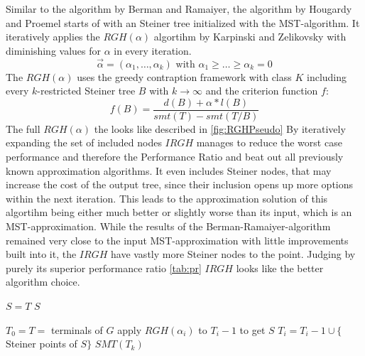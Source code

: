 Similar to the algorithm by Berman and Ramaiyer, the algorithm by Hougardy and Proemel \cite{HoPr99} starts of with an Steiner tree initialized with the MST-algorithm. It iteratively applies the $RGH(\alpha)$ algortihm by Karpinski and Zelikovsky \cite{karpinski1997new} with diminishing values for $\alpha$ in every iteration.$$\vec{\alpha}=(\alpha_1,\dots,\alpha_k) \text{ with } \alpha_1 \geq \dots \geq \alpha_k=0$$ 
The $RGH(\alpha)$ uses the greedy contraption framework \cite{karpinski1997new} with class $K$ including every $k$-restricted Steiner tree $B$ with $k\to\infty$ and the criterion function $f$: $$ f(B) = \frac{d(B) + \alpha * l(B)}{smt(T)-smt(T/B)} $$
The full $RGH(\alpha)$ the looks like described in \ref{fig:RGHPseudo}
By iteratively expanding the set of included nodes $IRGH$ manages to reduce the worst case performance and therefore the Performance Ratio and beat out all previously known approximation algorithms. It even includes Steiner nodes, that may increase the cost of the output tree, since their inclusion opens up more options within the next iteration. This leads to the approximation solution of this algortihm being either much better or slightly worse than its input, which is an MST-approximation.  While the results of the Berman-Ramaiyer-algorithm remained very close to the input MST-approximation with little improvements built into it, the $IRGH$ have vastly more Steiner nodes to the point. Judging by purely its superior performance ratio \ref{tab:pr} $IRGH$ looks like the better algorithm choice. 

\begin{algorithm}[hb]
$S=T$\;
 {
}
\KwRet $S$\;

\label{fig:RGHPseudo}
\end{algorithm}


\begin{algorithm}[hb]
$T_0=T=$ terminals of $G$\;
 {
	apply $RGH(\alpha_i)$ to $T_i-1$ to get $S$\;
	$T_i=T_i-1 \cup \{$Steiner points of $S\}$\;
}
\KwRet $SMT(T_k)$\;
\label{fig:IRGHPseudo}
\end{algorithm}
